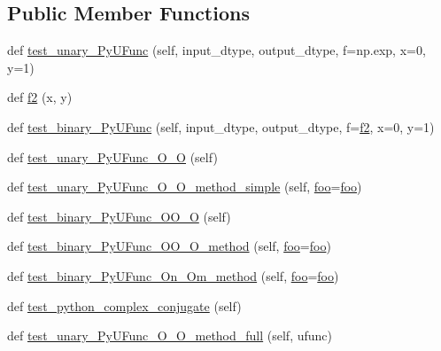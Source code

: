 \subsection*{Public Member Functions}
\begin{DoxyCompactItemize}
\item 
def \hyperlink{classnumpy_1_1core_1_1tests_1_1test__ufunc_1_1TestUfuncGenericLoops_a3b48379f0df33c2bb33e0a0770e0934b}{test\+\_\+unary\+\_\+\+Py\+U\+Func} (self, input\+\_\+dtype, output\+\_\+dtype, f=np.\+exp, x=0, y=1)
\item 
def \hyperlink{classnumpy_1_1core_1_1tests_1_1test__ufunc_1_1TestUfuncGenericLoops_ab4c7f17e3885d1bab81506ef9fa88076}{f2} (x, y)
\item 
def \hyperlink{classnumpy_1_1core_1_1tests_1_1test__ufunc_1_1TestUfuncGenericLoops_a01bdf31918b2bba3ce0185e4f3f77893}{test\+\_\+binary\+\_\+\+Py\+U\+Func} (self, input\+\_\+dtype, output\+\_\+dtype, f=\hyperlink{classnumpy_1_1core_1_1tests_1_1test__ufunc_1_1TestUfuncGenericLoops_ab4c7f17e3885d1bab81506ef9fa88076}{f2}, x=0, y=1)
\item 
def \hyperlink{classnumpy_1_1core_1_1tests_1_1test__ufunc_1_1TestUfuncGenericLoops_a8e9c0b7bd8f4e73abf010dd2ecd7c5ec}{test\+\_\+unary\+\_\+\+Py\+U\+Func\+\_\+\+O\+\_\+O} (self)
\item 
def \hyperlink{classnumpy_1_1core_1_1tests_1_1test__ufunc_1_1TestUfuncGenericLoops_a439efc5901727ff98d2fb9d46699e28a}{test\+\_\+unary\+\_\+\+Py\+U\+Func\+\_\+\+O\+\_\+\+O\+\_\+method\+\_\+simple} (self, \hyperlink{classnumpy_1_1core_1_1tests_1_1test__ufunc_1_1TestUfuncGenericLoops_1_1foo}{foo}=\hyperlink{classnumpy_1_1core_1_1tests_1_1test__ufunc_1_1TestUfuncGenericLoops_1_1foo}{foo})
\item 
def \hyperlink{classnumpy_1_1core_1_1tests_1_1test__ufunc_1_1TestUfuncGenericLoops_a553e8549ae34e7b5e6a3dd48abe733a3}{test\+\_\+binary\+\_\+\+Py\+U\+Func\+\_\+\+O\+O\+\_\+O} (self)
\item 
def \hyperlink{classnumpy_1_1core_1_1tests_1_1test__ufunc_1_1TestUfuncGenericLoops_a7c7e04722826493088df3b2bed7d62b4}{test\+\_\+binary\+\_\+\+Py\+U\+Func\+\_\+\+O\+O\+\_\+\+O\+\_\+method} (self, \hyperlink{classnumpy_1_1core_1_1tests_1_1test__ufunc_1_1TestUfuncGenericLoops_1_1foo}{foo}=\hyperlink{classnumpy_1_1core_1_1tests_1_1test__ufunc_1_1TestUfuncGenericLoops_1_1foo}{foo})
\item 
def \hyperlink{classnumpy_1_1core_1_1tests_1_1test__ufunc_1_1TestUfuncGenericLoops_ad05fca5c54fca7d9f3a8cd2306bfaac1}{test\+\_\+binary\+\_\+\+Py\+U\+Func\+\_\+\+On\+\_\+\+Om\+\_\+method} (self, \hyperlink{classnumpy_1_1core_1_1tests_1_1test__ufunc_1_1TestUfuncGenericLoops_1_1foo}{foo}=\hyperlink{classnumpy_1_1core_1_1tests_1_1test__ufunc_1_1TestUfuncGenericLoops_1_1foo}{foo})
\item 
def \hyperlink{classnumpy_1_1core_1_1tests_1_1test__ufunc_1_1TestUfuncGenericLoops_abe1facf8eae46690c740c6285de9f1fa}{test\+\_\+python\+\_\+complex\+\_\+conjugate} (self)
\item 
def \hyperlink{classnumpy_1_1core_1_1tests_1_1test__ufunc_1_1TestUfuncGenericLoops_acbaa1a01ab52e5f3bd7206babd5e3a9a}{test\+\_\+unary\+\_\+\+Py\+U\+Func\+\_\+\+O\+\_\+\+O\+\_\+method\+\_\+full} (self, ufunc)
\end{DoxyCompactItemize}
